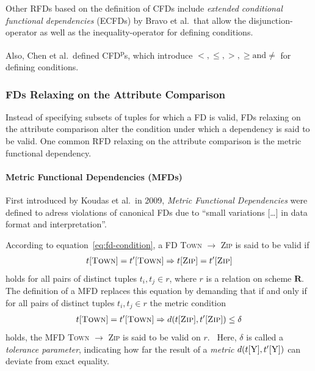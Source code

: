 Other RFDs based on the definition of CFDs include \emph{extended conditional functional dependencies} (ECFDs) by Bravo et al.\ that allow the disjunction-operator as well as the inequality-operator for defining conditions.~\cite{BRA08}

Also, Chen et al.\ defined CFD\textsuperscript{p}s, which introduce \( <, \leq, >, \geq \text{and} \neq \) for defining conditions.~\cite{CHE09}

\subsubsection{FDs Relaxing on the Attribute Comparison}
Instead of specifying subsets of tuples for which a FD is valid, FDs relaxing on the attribute comparison alter the condition under which a dependency is said to be valid.
One common RFD relaxing on the attribute comparison is the metric functional dependency.

\paragraph{Metric Functional Dependencies (MFDs)}
First introduced by Koudas et al.\ in 2009, \emph{Metric Functional Dependencies} were defined to adress violations of canonical FDs due to ``small variations [\dots] in data format and interpretation''.~\cite[p.~1]{KOU09}

According to equation~\ref{eq:fd-condition}, a FD \textsc{Town} \( \to\) \textsc{Zip} is said to be valid if
\begin{align}
    t[\textsc{Town}] = t'[\textsc{Town}] \Rightarrow t[\textsc{Zip}] = t'[\textsc{Zip}]
\end{align}
holds for all pairs of distinct tuples \( t_i, t_j \in r \), where \( r \) is a relation on scheme \( \boldsymbol{R} \).
The definition of a MFD replaces this equation by demanding that if and only if for all pairs of distinct tuples \( t_i, t_j \in r \) the metric condition
\begin{align}\label{eq:mfd-condition}
    t[\textsc{Town}] = t'[\textsc{Town}] \Rightarrow d(t[\textsc{Zip}], t'[\textsc{Zip}]) \leq \delta
\end{align}
holds, the MFD \textsc{Town} \( \to\) \textsc{Zip} is said to be valid on \( r \).~\cite[p.~2]{KOU09}
Here, \( \delta \) is called a \emph{tolerance parameter}, indicating how far the result of a \emph{metric} \( d(t[\textsc{Y}], t'[\textsc{Y}]) \) can deviate from exact equality.

